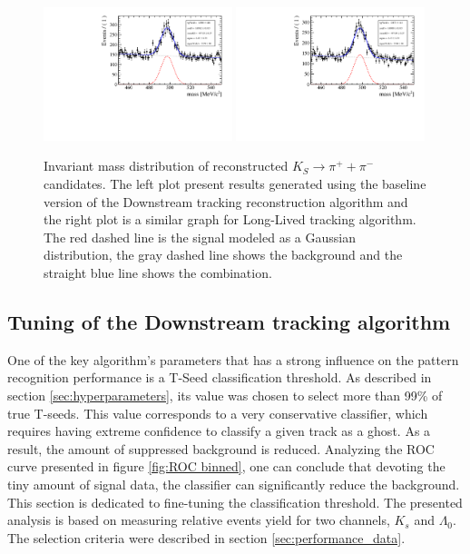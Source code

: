 \begin{figure}[tbph]
\begin{center}
\includegraphics[rotate=-90, width = 0.49\textwidth]{figures/tracking_ks/Mas_ks_baseline.pdf} 
\includegraphics[rotate=-90, width = 0.49\textwidth]{figures/tracking_ks/Mas_ks_bdt.pdf}
\caption{Invariant mass distribution of reconstructed $K_S \rightarrow \pi^{+} + \pi^{-}$ candidates.  The left plot present results generated using the baseline version of the Downstream tracking reconstruction algorithm and the right plot is a  similar graph for Long-Lived tracking algorithm. The red  dashed line is the signal modeled as a Gaussian distribution, the gray dashed line shows the background and the straight blue line shows the combination.}
\label{fig:Ks_performance}
 \end{center}
 \end{figure}




\subsection{Tuning of the Downstream tracking algorithm}

One of the key algorithm's parameters that has a strong influence on the pattern recognition performance is a T-Seed classification threshold. As described in section \ref{sec:hyperparameters}, its value was chosen to select more than 99\% of true T-seeds. This value corresponds to a very conservative classifier, which requires having extreme confidence to classify a given track as a ghost. As a result, the amount of suppressed background is reduced. Analyzing the ROC curve presented in figure \ref{fig:ROC binned}, one can conclude that devoting the tiny amount of signal data, the classifier can significantly reduce the background. This section is dedicated to fine-tuning the classification threshold. The presented analysis is based on measuring relative events yield for two channels, $K_s$ and $\Lambda_0$. The selection criteria were described in section \ref{sec:performance_data}. 

